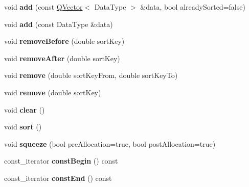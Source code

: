 \begin{DoxyCompactItemize}
void {\bfseries add} (const \hyperlink{class_q_vector}{Q\+Vector}$<$ Data\+Type $>$ \&data, bool already\+Sorted=false)
\item 
\mbox{\label{class_q_c_p_data_container_a715e8e9972466804954a2f8fbd5288b7}} 
void {\bfseries add} (const Data\+Type \&data)
\item 
\mbox{\label{class_q_c_p_data_container_aa7f74cbce304b0369e1626c3798e1eda}} 
void {\bfseries remove\+Before} (double sort\+Key)
\item 
\mbox{\label{class_q_c_p_data_container_abbe5d87ffc10b5aeffa5bb42cf03aa3c}} 
void {\bfseries remove\+After} (double sort\+Key)
\item 
\mbox{\label{class_q_c_p_data_container_ae5f569a120648b167efa78835f12fd38}} 
void {\bfseries remove} (double sort\+Key\+From, double sort\+Key\+To)
\item 
\mbox{\label{class_q_c_p_data_container_a2dbded7f0732bacf9db48fdfbbb620bc}} 
void {\bfseries remove} (double sort\+Key)
\item 
\mbox{\label{class_q_c_p_data_container_a7e2b29736c6fd761649bda1a54ba967f}} 
void {\bfseries clear} ()
\item 
\mbox{\label{class_q_c_p_data_container_a75da92e33063b63d6da5014683591d45}} 
void {\bfseries sort} ()
\item 
\mbox{\label{class_q_c_p_data_container_a82fcc511def22287fc62579d0706387c}} 
void {\bfseries squeeze} (bool pre\+Allocation=true, bool post\+Allocation=true)
\item 
\mbox{\label{class_q_c_p_data_container_afcfa138af53d0c8c78953a71d7960ae3}} 
const\+\_\+iterator {\bfseries const\+Begin} () const
\item 
\mbox{\label{class_q_c_p_data_container_aa7cc0ad035a00421ba5810fe673c5cb8}} 
const\+\_\+iterator {\bfseries const\+End} () const

\end{DoxyCompactItemize}
